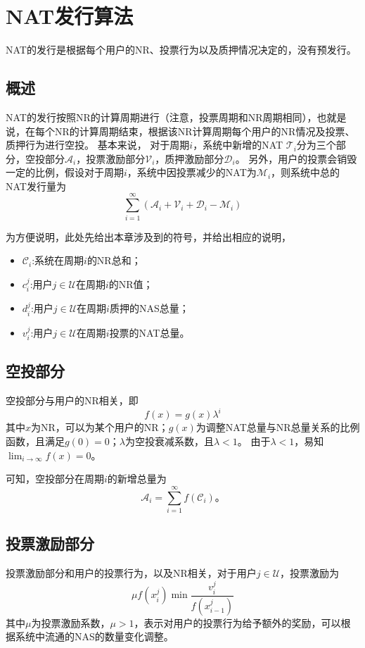 
\section{NAT发行算法}

NAT的发行是根据每个用户的NR、投票行为以及质押情况决定的，没有预发行。

\subsection{概述}
NAT的发行按照NR的计算周期进行（注意，投票周期和NR周期相同），也就是说，在每个NR的计算周期结束，根据该NR计算周期每个用户的NR情况及投票、质押行为进行空投。
基本来说，
对于周期$i$，系统中新增的NAT $\mathcal{T}_i$分为三个部分，空投部分$\mathcal{A}_i$，投票激励部分$\mathcal{V}_i$，质押激励部分$\mathcal{D}_i$。
另外，用户的投票会销毁一定的比例，假设对于周期$i$，系统中因投票减少的NAT为$\mathcal{M}_i$，则系统中总的NAT发行量为
\[
\sum_{i=1}^{\infty} (\mathcal{A}_i + \mathcal{V}_i + \mathcal{D}_i - \mathcal{M}_i)
\]

为方便说明，此处先给出本章涉及到的符号，并给出相应的说明，
\begin{itemize}
\item $\mathcal{C}_i$:系统在周期$i$的NR总和；
\item $c_i^j$:用户$j \in \mathcal{U}$在周期$i$的NR值；
\item $d_i^j$:用户$j \in \mathcal{U}$在周期$i$质押的NAS总量；
\item $v_i^j$:用户$j \in \mathcal{U}$在周期$i$投票的NAT总量。
\end{itemize}

\subsection{空投部分}
空投部分与用户的NR相关，即
\[
    f(x) = g(x)\lambda^i
\]
\noindent 其中$x$为NR，可以为某个用户的NR；$g(x)$为调整NAT总量与NR总量关系的比例函数，且满足$g(0) = 0$；$\lambda$为空投衰减系数，且$\lambda < 1$。
由于$\lambda < 1$，易知$\lim_{i\to \infty}f(x) = 0$。

可知，空投部分在周期$i$的新增总量为
\[
\mathcal{A}_i = \sum_{i=1}^{\infty}f(\mathcal{C}_i)。
\]

\subsection{投票激励部分}
投票激励部分和用户的投票行为，以及NR相关，对于用户$j \in \mathcal{U}$，投票激励为
\[
\mu f(x_i^j) \min{\frac{v_i^j}{f(x_{i-1}^j)}}
\]
\noindent 其中$\mu$为投票激励系数，$\mu > 1$，表示对用户的投票行为给予额外的奖励，可以根据系统中流通的NAS的数量变化调整。

